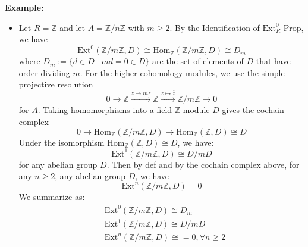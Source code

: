 \noindent\textbf{Example:} \begin{itemize}
    \item Let $R= \mathbb{Z}$ and let $A= \mathbb{Z}/ n\mathbb{Z}$ with $m\geq 2$. By the Identification-of-$\text{Ext}_R^0$ Prop, we have
    \[
    \text{Ext}^0 (\mathbb{Z}/m\mathbb{Z} ,D) \cong \text{Hom}_\mathbb{Z} (\mathbb{Z}/ m\mathbb{Z} ,D) \cong D_m
    \]
    where $D_m:= \{d \in D\mid md=0 \in D\}$ are the set of elements of $D$ that have order dividing $m$. For the higher cohomology modules, we use the simple projective resolution
    \[
    0\to \mathbb{Z} \xrightarrow{z \mapsto mz} \mathbb{Z} \xrightarrow{z \mapsto \overline{z}} \mathbb{Z}/ m\mathbb{Z} \to 0
    \]
    for $A$. Taking homomorphisms into a field $\mathbb{Z}$-module $D$ gives the cochain complex
    \[
    0\to \text{Hom}_\mathbb{Z} (\mathbb{Z} /m \mathbb{Z},D) \to \text{Hom}_\mathbb{Z} (\mathbb{Z} ,D) \cong D
    \]
    Under the isomorphism $\text{Hom}_\mathbb{Z} (\mathbb{Z} ,D) \cong D$, we have:
    \[
    \text{Ext}^1 (\mathbb{Z}/ m\mathbb{Z}, D) \cong D/mD
    \]
    for any abelian group $D$. Then by def and by the cochain complex above, for any $n\geq 2$, any abelian group $D$, we have
    \[
    \text{Ext}^n (\mathbb{Z}/ m\mathbb{Z}, D)=0
    \]
    We summarize as:
    \begin{align*}
        & \text{Ext}^0 (\mathbb{Z}/m\mathbb{Z} ,D) \cong D_m\\
        &\text{Ext}^1 (\mathbb{Z}/m\mathbb{Z} ,D) \cong D/mD\\
        &\text{Ext}^n (\mathbb{Z}/m\mathbb{Z} ,D) \cong=0 ,\forall n\geq 2
    \end{align*}


\end{itemize}
